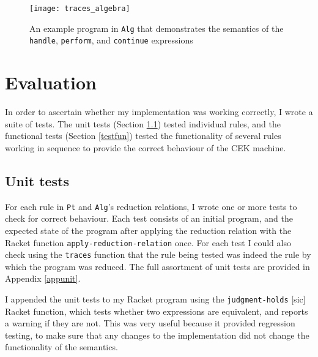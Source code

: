 \documentclass[12pt,a4paper,twoside,openright]{report}
\begin{document}
\begin{sidewaysfigure}
\centering
\texttt{[image: traces\_algebra]}
\caption{An example program in \texttt{Alg} that demonstrates the semantics of the \texttt{handle}, \texttt{perform}, and \texttt{continue} expressions}
\label{fig:traces_algebra}
\end{sidewaysfigure}

\chapter{Evaluation}

In order to ascertain whether my implementation was working correctly, I wrote a suite of tests. The unit tests (Section \ref{testunit}) tested individual rules, and the functional tests (Section \ref{testfun}) tested the functionality of several rules working in sequence to provide the correct behaviour of the CEK machine.

\section{Unit tests}\label{testunit}

For each rule in \texttt{Pt} and \texttt{Alg}'s reduction relations, I wrote one or more tests to check for correct behaviour. Each test consists of an initial program, and the expected state of the program after applying the reduction relation with the Racket function \texttt{apply-reduction-relation} once. For each test I could also check using the \texttt{traces} function that the rule being tested was indeed the rule by which the program was reduced. The full assortment of unit tests are provided in Appendix \ref{appunit}.

I appended the unit tests to my Racket program using the \texttt{judgment-holds} [sic] Racket function, which tests whether two expressions are equivalent, and reports a warning if they are not. This was very useful because it provided regression testing, to make sure that any changes to the implementation did not change the functionality of the semantics.
\end{document}
